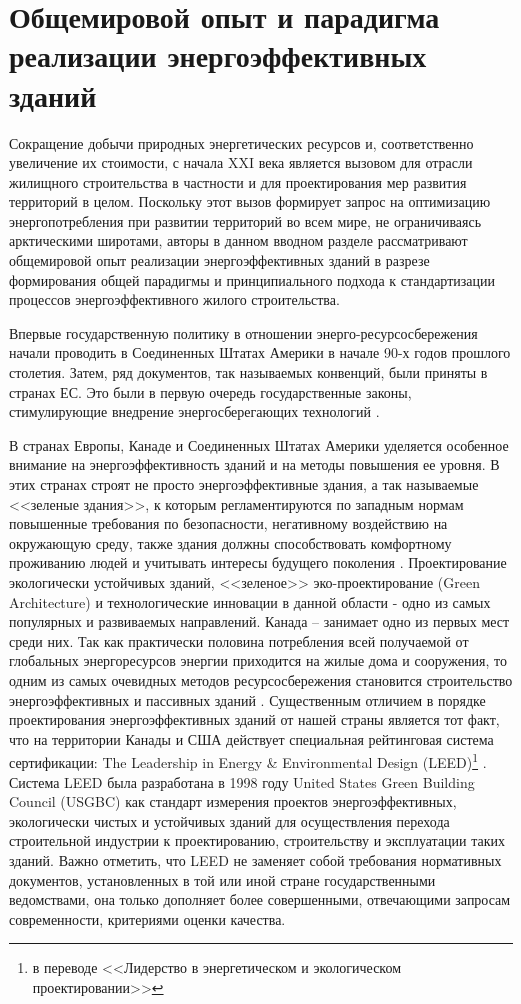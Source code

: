 \section{Общемировой опыт и парадигма реализации энергоэффективных зданий}


Сокращение добычи природных энергетических ресурсов и, соответственно увеличение их стоимости, с начала XXI века является вызовом для отрасли жилищного строительства в частности и
для проектирования мер развития территорий в целом. Поскольку этот вызов формирует запрос на оптимизацию энергопотребления при развитии территорий во всем мире,
не ограничиваясь арктическими широтами, авторы в данном вводном разделе рассматривают общемировой опыт реализации энергоэффективных зданий в разрезе формирования
общей парадигмы и принципиального подхода к стандартизации процессов энергоэффективного жилого строительства.

Впервые государственную политику в отношении энерго-ресурсосбережения начали проводить в Соединенных Штатах Америки в начале 90-х годов прошлого столетия.
Затем, ряд документов, так называемых конвенций, были приняты в странах ЕС.
Это были в первую очередь государственные законы, стимулирующие внедрение энергосберегающих технологий \Code{[1, 2]}. 

В странах Европы, Канаде и Соединенных Штатах Америки уделяется особенное внимание на энергоэффективность зданий и на методы повышения ее уровня.
В этих странах строят не просто энергоэффективные здания, а так называемые <<зеленые здания>>, к которым регламентируются по западным нормам повышенные требования по безопасности,
негативному воздействию на окружающую среду, также здания должны способствовать комфортному проживанию людей и учитывать интересы будущего поколения \Code{[3]}.
Проектирование экологически устойчивых зданий, <<зеленое>> эко-проектирование (Green Architecture) \Code{[4]} и технологические инновации в данной области - одно из самых популярных и
развиваемых направлений. Канада – занимает одно из первых мест среди них. Так как практически половина потребления всей получаемой от глобальных энергоресурсов энергии
приходится на жилые дома и сооружения, то одним из самых очевидных методов ресурсосбережения становится строительство энергоэффективных и пассивных зданий \Code{[5]}. 
Существенным отличием в порядке проектирования энергоэффективных зданий от нашей страны является тот факт, что на территории Канады и США действует
специальная рейтинговая система сертификации: The Leadership in Energy \& Environmental Design (LEED)\footnote{в переводе <<Лидерство в энергетическом и экологическом проектировании>>} \Code{[6]} .
Система LEED была разработана в 1998 году United States Green Building Council (USGBC) как стандарт измерения проектов энергоэффективных,
экологически чистых и устойчивых зданий для осуществления перехода строительной индустрии к проектированию, строительству и эксплуатации таких зданий.
Важно отметить, что LEED не заменяет собой требования нормативных документов, установленных в той или иной стране государственными ведомствами,
она только дополняет более совершенными, отвечающими запросам современности, критериями оценки качества.

